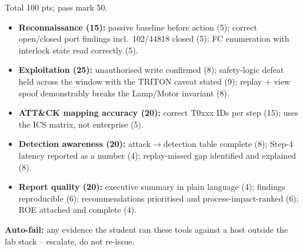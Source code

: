 \documentclass[11pt,a4paper]{article}
\begin{document}
\begin{rubricbox}
Total 100 pts; pass mark 50.
\begin{itemize}\setlength{\itemsep}{1pt}
  \item \textbf{Reconnaissance (15):} passive baseline before action
        (5); correct open/closed port findings incl.\ 102/44818 closed
        (5); FC enumeration with interlock state read correctly (5).
  \item \textbf{Exploitation (25):} unauthorised write confirmed (8);
        safety-logic defeat held across the window with the TRITON
        caveat stated (9); replay + view spoof demonstrably breaks the
        Lamp/Motor invariant (8).
  \item \textbf{ATT\&CK mapping accuracy (20):} correct T0xxx IDs per
        step (15); uses the ICS matrix, not enterprise (5).
  \item \textbf{Detection awareness (20):} attack$\to$detection table
        complete (8); Step-4 latency reported as a number (4);
        replay-missed gap identified and explained (8).
  \item \textbf{Report quality (20):} executive summary in plain
        language (4); findings reproducible (6); recommendations
        prioritised and process-impact-ranked (6); ROE attached and
        complete (4).
\end{itemize}
\textbf{Auto-fail:} any evidence the student ran these tools against a
host outside the lab stack -- escalate, do not re-issue.
\end{rubricbox}
\end{document}
